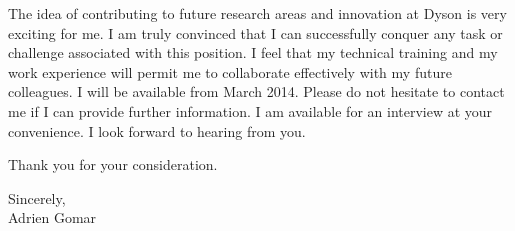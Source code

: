 \documentclass[10pt]{article}
\begin{document}
\noindent
The idea of contributing to future research areas and innovation at Dyson is very exciting for me. I am truly convinced that I can successfully conquer any task or challenge associated with this position. I feel that my technical training and my work experience will permit me to collaborate effectively with my future colleagues.
I will be available from March 2014. Please do not hesitate to contact me if I can provide further information. I am available for an interview at your convenience.  I look forward to hearing from you.
\newline

\noindent
Thank you for your consideration.
\newline

\begin{flushright}
Sincerely, \\
Adrien Gomar
\end{flushright}
\end{document}

